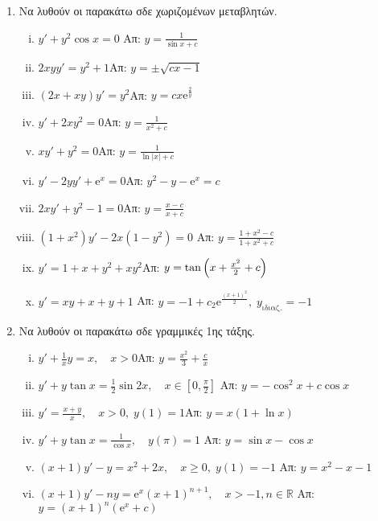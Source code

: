 \documentclass[a4paper,table]{report}
\begin{document}
\begin{center}
  \minibox{\large \bfseries \textcolor{Col1}{Συνήθεις Διαφορικές Εξισώσεις - 1ης τάξης}}
\end{center}

\vspace{\baselineskip}

\begin{enumerate}

  \item Να λυθούν οι παρακάτω σδε χωριζομένων μεταβλητών.

    \begin{enumerate}[i)]
      \item $ y'+y^{2} \cos{x} = 0 $ \hfill Απ: $ y = \frac{1}{\sin{x} + c} $  %
      \item $2xyy'=y^2+1$\hfill Απ: $y= \pm \sqrt{cx-1}$  %
      \item $(2x+xy)y'=y^2$\hfill Απ: $y=cx \mathrm{e}^{\frac{2}{y}}$
      \item $y'+2xy^2=0$\hfill Απ: $y=\frac{1}{x^2+c}$ %
      \item $xy'+y^2=0$\hfill Απ: $y=\frac{1}{\ln|x|+c}$ %
      \item $y'-2yy'+ \mathrm{e}^x=0$\hfill Απ: $y^2-y- \mathrm{e}^x=c$ %
      \item $2xy'+y^2-1=0$\hfill Απ: $y=\frac{x-c}{x+c}$ %
      \item $(1+x^2)y'-2x(1-y^2)=0$ %
        \hfill Απ: $y= \frac{1+x^{2}-c}{1+x^{2}+c}$
      \item $y'=1+x+y^2+xy^2$\hfill Απ: $y=\tan{\Bigl(x+\frac{x^2}{2}+c\Bigr)}$ %
      \item $y'=xy+x+y+1$
        \hfill Απ: $y=-1+c_2 \mathrm{e}^{\frac{(x+1)^2}{2}}, \; y_{\text{ιδιαζ.}}=-1$
    \end{enumerate}

  \item Να λυθούν οι παρακάτω σδε γραμμικές 1ης τάξης.

    \begin{enumerate}[i)]
      \item $y'+\frac{1}{x}y=x, \quad x>0$\hfill Απ: $y=\frac{x^2}{3}+\frac{c}{x}$
      \item $y'+y\tan x=\frac{1}{2}\sin 2x, \quad x\in [0,\frac{\pi}{2}]$
        \hfill Απ: $y=-\cos^2 x+c\cos x$
      \item  $y'=\frac{x+y}{x}, \quad x>0, \; y(1)=1$\hfill Απ: $y=x(1+\ln x)$ %
      \item $y'+y\tan x =\frac{1}{\cos x}, \quad y(\pi)=1$ %
        \hfill Απ: $y=\sin x-\cos x$
      \item $(x+1)y'-y=x^2+2x, \quad x \geq 0, \; y(1)=-1$ %
        \hfill Απ: $y=x^2-x-1$
      \item $(x+1)y'-ny= \mathrm{e}^x(x+1)^{n+1}, \quad x>-1, n\in \mathbb{R}$
        \hfill Απ: $y=(x+1)^n(\mathrm{e}^x+c)$
    \end{enumerate}


\end{enumerate}
\end{document}
